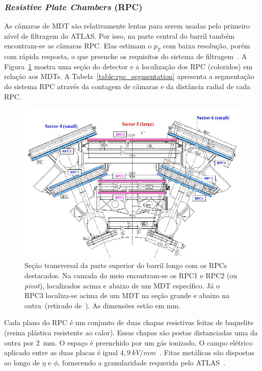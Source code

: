 \subsubsection*{\emph{Resistive Plate Chambers} (RPC)}

As câmaras de MDT são relativamente lentas para serem usadas pelo primeiro
nível de filtragem do ATLAS. Por isso, na parte central do barril também
encontram-se as câmaras RPC. Elas estimam o $p_T$ com baixa resolução, porém
com rápida resposta, o que preenche os requisitos do sistema de
filtragem~\cite{MUONTDR1997}. A Figura~\ref{fig:rpclocation} mostra uma seção
do detector e a localização dos RPC (coloridos) em relação aos MDTs. A
Tabela~\ref{table:rpc_segmentation} apresenta a segmentação do sistema RPC
através da contagem de câmaras e da distância radial de cada RPC.

\begin{figure}[htpb!]
    \centering
        \includegraphics[width=\textwidth]{images/rpc_location.png}
        \caption[Localização dos RPCs na Seção transversal da parte superior do
        barril longo.]{Seção transversal da parte superior do barril longo com
        os RPCs destacados. Na camada do meio encontram-se os RPC1 e RPC2 (ou
        \emph{pivot}), localizados acima e abaixo de um MDT específico. Já o RPC3
        localiza-se acima de um MDT na seção grande e abaixo na outra~(retirado
        de~\cite{Aad:1275998}). As dimensões estão em mm.}
        \label{fig:rpclocation}
\end{figure}


Cada plano do RPC é um conjunto de duas chapas resistivas feitas de baquelite
(resina plástica resistente ao calor). Essas chapas são postas distanciadas uma
da outra por 2~mm. O espaço é preenchido por um gás ionizado. O campo
elétrico aplicado entre as duas placas é igual $ 4,9~kV/mm$~\cite{ATLAS2008}.
Fitas metálicas são dispostas ao longo de $\eta$ e $\phi$, fornecendo a
granularidade requerida pelo ATLAS~\cite{MUONTDR1997, POLINI2012}.

